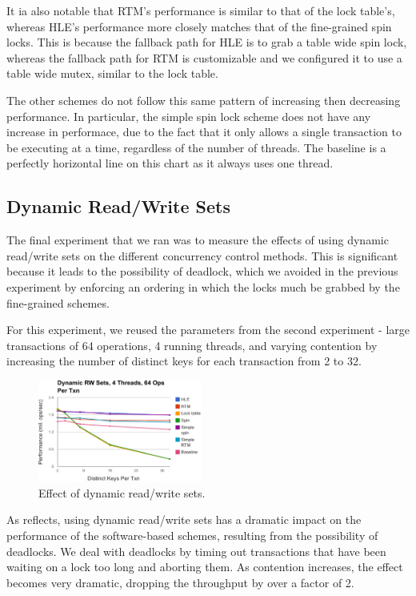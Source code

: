 It ia also notable that RTM's performance is similar to that of the lock table's, 
whereas HLE's performance more closely matches that of the fine-grained spin locks. 
This is because the fallback path for HLE is to grab a table wide spin lock, whereas 
the fallback path for RTM is customizable and we configured it to use a table wide 
mutex, similar to the lock table.

The other schemes do not follow this same pattern of increasing then decreasing 
performance. In particular, the simple spin lock scheme does not have any increase 
in performace, due to the fact that it only allows a single transaction to be 
executing at a time, regardless of the number of threads. The baseline is a 
perfectly horizontal line on this chart as it always uses one thread.

\subsection{Dynamic Read/Write Sets}

The final experiment that we ran was to measure the effects of using dynamic 
read/write sets on the different concurrency control methods. This is 
significant because it leads to the possibility of deadlock, which we avoided 
in the previous experiment by enforcing an ordering in which the locks much 
be grabbed by the fine-grained schemes.

For this experiment, we reused the parameters from the second experiment - 
large transactions of 64 operations, 4 running threads, and varying 
contention by increasing the number of distinct keys for each transaction 
from 2 to 32.

\begin{figure}[h!]
  \centering
  \includegraphics[width=0.48\textwidth]{figure/dynamic.pdf}
  \caption{Effect of dynamic read/write sets.}
  \label{fig:dynamic} 
\end{figure}

As  reflects, using dynamic read/write sets has a dramatic 
impact on the performance of the software-based schemes, resulting from the 
possibility of deadlocks. We deal with deadlocks by timing out transactions 
that have been waiting on a lock too long and aborting them. As contention 
increases, the effect becomes very dramatic, dropping the throughput by over 
a factor of 2.


